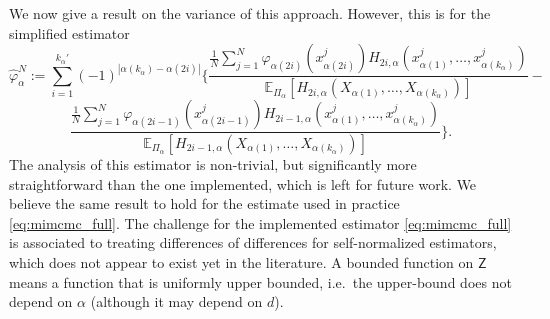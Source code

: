 \documentclass[english]{article}
\begin{document}
We now give a result on the variance of this approach. 
However, this is for the simplified estimator
\begin{equation}\label{eq:vp_def}
\widehat{\varphi}^N_\alpha := \sum_{i=1}^{k_{\alpha}'}(-1)^{|\alpha(k_{\alpha})-\alpha(2i)|}
\Bigg\{
\frac{
\frac{1}{N}\sum_{j=1}^N
\varphi_{\alpha(2i)}(x^j_{\alpha(2i)})
H_{2i,\alpha}(x^j_{\alpha(1)},\dots,x^j_{\alpha(k_{\alpha})})
}
{
\mathbb{E}_{\Pi_{\alpha}}[H_{2i,\alpha}(X_{\alpha(1)},\dots,X_{\alpha(k_{\alpha})})]
} -
\end{equation}
$$
\frac{
\frac{1}{N}\sum_{j=1}^N
\varphi_{\alpha(2i-1)}(x^j_{\alpha(2i-1)})
H_{2i-1,\alpha}(x^j_{\alpha(1)},\dots,x^j_{\alpha(k_{\alpha})})
}
{
\mathbb{E}_{\Pi_{\alpha}}[H_{2i-1,\alpha}(X_{\alpha(1)},\dots,X_{\alpha(k_{\alpha})})]
} 
\Bigg\}.
$$
The analysis of this estimator is non-trivial, but significantly more straightforward than the one implemented, which
is left for future work. We believe the same result to hold for the estimate used in practice \eqref{eq:mimcmc_full}. 
The challenge for the implemented estimator \eqref{eq:mimcmc_full} is associated to treating 
differences of differences for self-normalized estimators, which
does not appear to exist yet in the literature.
A bounded function on $\mathsf{Z}$ means a function that is uniformly upper bounded, i.e.~the upper-bound does not depend on $\alpha$ (although it may depend on $d$).
\end{document}
